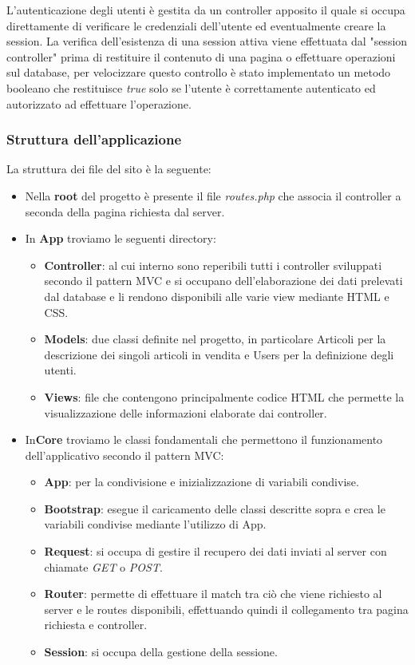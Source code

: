 L’autenticazione degli utenti è gestita da un controller apposito il quale si occupa direttamente di verificare le credenziali dell’utente ed eventualmente creare la session.
La verifica dell’esistenza di una session attiva viene effettuata dal "session controller" prima di restituire il contenuto di una pagina o effettuare operazioni sul database, per velocizzare questo controllo è stato implementato un metodo booleano che restituisce \textit{true} solo se l’utente è correttamente autenticato ed autorizzato ad effettuare l’operazione.
\subsubsection{Struttura dell'applicazione}
La struttura dei file del sito è la seguente:
\begin{itemize}
	\item Nella \textbf{root} del progetto è presente il file \textit{routes.php} che associa il controller a seconda della pagina richiesta dal server.
	\item In \textbf{App} troviamo le seguenti directory:
	\begin{itemize}
		\item \textbf{Controller}: al cui interno sono reperibili tutti i controller sviluppati secondo il pattern MVC e si occupano dell’elaborazione dei dati prelevati dal database e li rendono disponibili alle varie view mediante HTML e CSS.
		\item \textbf{Models}: due classi definite nel progetto, in particolare Articoli per la descrizione dei singoli articoli in vendita e Users per la definizione degli utenti.
		\item \textbf{Views}: file che contengono principalmente codice HTML che permette la visualizzazione delle informazioni elaborate dai controller.
	\end{itemize}
	\item In\textbf{Core} troviamo le classi fondamentali che permettono il funzionamento dell'applicativo secondo il pattern MVC:
	\begin{itemize}
		\item \textbf{App}: per la condivisione e inizializzazione di variabili condivise.
		\item \textbf{Bootstrap}: esegue il caricamento delle classi descritte sopra e crea le variabili condivise mediante l’utilizzo di App.
		\item \textbf{Request}: si occupa di gestire il recupero dei dati inviati al server con chiamate \textit{GET} o \textit{POST}.
		\item \textbf{Router}: permette di effettuare il match tra ciò che viene richiesto al server e le routes disponibili, effettuando quindi il collegamento tra pagina richiesta e controller.
		\item \textbf{Session}: si occupa della gestione della sessione.
	\end{itemize}
\end{itemize}

